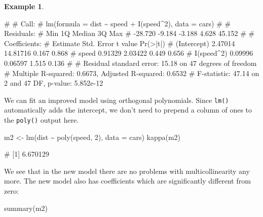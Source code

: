 \documentclass[
  a4paper,
]{article}
\newenvironment{Shaded}{\begin{snugshade}}{\end{snugshade}}
\newcommand{\AttributeTok}[1]{\textcolor[rgb]{0.77,0.63,0.00}{#1}}
\newcommand{\DecValTok}[1]{\textcolor[rgb]{0.00,0.00,0.81}{#1}}
\newcommand{\FunctionTok}[1]{\textcolor[rgb]{0.00,0.00,0.00}{#1}}
\newcommand{\NormalTok}[1]{#1}
\newcommand{\OtherTok}[1]{\textcolor[rgb]{0.56,0.35,0.01}{#1}}
\newcommand{\SpecialCharTok}[1]{\textcolor[rgb]{0.00,0.00,0.00}{#1}}
\theoremstyle{definition}
\theoremstyle{definition}
\newtheorem{example}{Example}[section]
\theoremstyle{definition}
\theoremstyle{definition}
\theoremstyle{remark}
\begin{document}
\begin{example}
\begin{Shaded}
\begin{Highlighting}[]
\NormalTok{\# }
\NormalTok{\# Call:}
\NormalTok{\# lm(formula = dist \textasciitilde{} speed + I(speed\^{}2), data = cars)}
\NormalTok{\# }
\NormalTok{\# Residuals:}
\NormalTok{\#     Min      1Q  Median      3Q     Max }
\NormalTok{\# {-}28.720  {-}9.184  {-}3.188   4.628  45.152 }
\NormalTok{\# }
\NormalTok{\# Coefficients:}
\NormalTok{\#             Estimate Std. Error t value Pr(\textgreater{}|t|)}
\NormalTok{\# (Intercept)  2.47014   14.81716   0.167    0.868}
\NormalTok{\# speed        0.91329    2.03422   0.449    0.656}
\NormalTok{\# I(speed\^{}2)   0.09996    0.06597   1.515    0.136}
\NormalTok{\# }
\NormalTok{\# Residual standard error: 15.18 on 47 degrees of freedom}
\NormalTok{\# Multiple R{-}squared:  0.6673,  Adjusted R{-}squared:  0.6532 }
\NormalTok{\# F{-}statistic: 47.14 on 2 and 47 DF,  p{-}value: 5.852e{-}12}
\end{Highlighting}
\end{Shaded}

We can fit an improved model using orthogonal polynomials. Since \texttt{lm()}
automatically adds the intercept, we don't need to prepend a column of ones to
the \texttt{poly()} output here.

\begin{Shaded}
\begin{Highlighting}[]
\NormalTok{m2 }\OtherTok{\textless{}{-}} \FunctionTok{lm}\NormalTok{(dist }\SpecialCharTok{\textasciitilde{}} \FunctionTok{poly}\NormalTok{(speed, }\DecValTok{2}\NormalTok{), }\AttributeTok{data =}\NormalTok{ cars)}
\FunctionTok{kappa}\NormalTok{(m2)}
\end{Highlighting}
\end{Shaded}

\begin{Shaded}
\begin{Highlighting}[]
\NormalTok{\# [1] 6.670129}
\end{Highlighting}
\end{Shaded}

We see that in the new model there are no problems with multicollinearity any
more. The new model also has coefficients which are significantly different
from zero:

\begin{Shaded}
\begin{Highlighting}[]
\FunctionTok{summary}\NormalTok{(m2)}
\end{Highlighting}
\end{Shaded}


\end{example}
\end{document}

